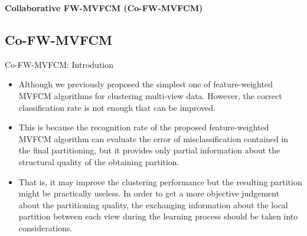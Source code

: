 \documentclass[compress,sky blue]{beamer}
\begin{document}

\begin{frame}{}
    \centering
    \Huge{\textbf{Collaborative FW-MVFCM (Co-FW-MVFCM)}}
\end{frame}



\subsection{Co-FW-MVFCM}




\begin{frame}{Co-FW-MVFCM: Introdution}
	\vspace{-0.6cm}	

\begin{itemize}
\item \scriptsize Although we previously proposed the simplest one of feature-weighted MVFCM algorithms for clustering multi-view data. However, the correct classification rate is not enough that can be improved.
\item \scriptsize  This is because the recognition rate of the proposed feature-weighted MVFCM algorithm can evaluate the error of misclassification contained in the final partitioning, but it provides only partial information about the structural quality of the obtaining partition. 
\item \scriptsize That is, it may improve the clustering performance but the resulting partition might be practically useless. In order to get a more objective judgement about the partitioning quality, the exchanging information about the local partition between each view during the learning process should be taken into considerations. 
\end{itemize}


\end{frame}
\end{document}
